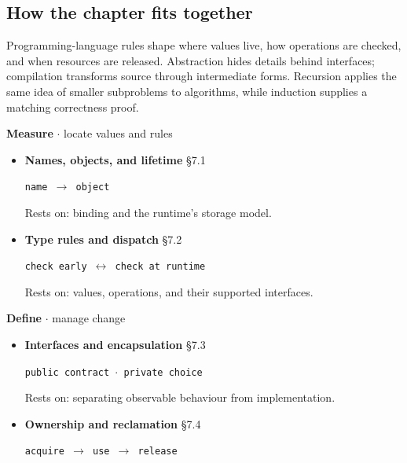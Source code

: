 \documentclass[11pt]{article}
\begin{document}
\begin{keepsection}
\section{How the chapter fits together}

Programming-language rules shape where values live, how operations are checked, and when resources are released. Abstraction hides details behind interfaces; compilation transforms source through intermediate forms. Recursion applies the same idea of smaller subproblems to algorithms, while induction supplies a matching correctness proof.

\textbf{Measure} \ensuremath{\cdot} locate values and rules

\begin{itemize}
\item {}
\textbf{Names, objects, and lifetime} \hfill{\small\color{FAUblue}§7.1}

\texttt{name \ensuremath{\to} object}

Rests on: binding and the runtime’s storage model.
\item {}
\textbf{Type rules and dispatch} \hfill{\small\color{FAUblue}§7.2}

\texttt{check early \ensuremath{\leftrightarrow} check at runtime}

Rests on: values, operations, and their supported interfaces.
\end{itemize}

\textbf{Define} \ensuremath{\cdot} manage change

\begin{itemize}
\item {}
\textbf{Interfaces and encapsulation} \hfill{\small\color{FAUblue}§7.3}

\texttt{public contract \ensuremath{\cdot} private choice}

Rests on: separating observable behaviour from implementation.
\item {}
\textbf{Ownership and reclamation} \hfill{\small\color{FAUblue}§7.4}

\texttt{acquire \ensuremath{\to} use \ensuremath{\to} release}


\end{itemize}
\end{keepsection}
\end{document}
